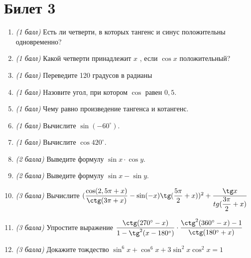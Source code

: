 \documentclass[12pt, a4paper]{article}
\begin{document}
\section*{Билет 3}
\begin{enumerate}
	\item \textit{(1 балл)}	Есть ли четверти, в которых тангенс и синус положительны одновременно? 
	\item \textit{(1 балл)}	Какой четверти принадлежит $x$ , если $\cos x$ положительный?
	\item \textit{(1 балл)}	Переведите 120 градусов в радианы
	\item \textit{(1 балл)}	Назовите угол, при котором $\cos$  равен $0,5$.
	\item \textit{(1 балл)} Чему равно произведение тангенса и котангенс.
	\item \textit{(1 балл)} Вычислите $\sin (-60^{\circ})$.
	\item \textit{(1 балл)}	Вычислите $\cos 420^{\circ}$.
	\item \textit{(2 балла)} Выведите формулу $\sin x \cdot \cos y$.
	\item \textit{(2 балла)} Выведите формулу $\sin x - \sin y$.
	\item \textit{(3 балла)} Вычислите $(\dfrac{\cos (2,5\pi + x)}{\ctg (3\pi + x)} - \sin (-x) \tg (\dfrac{5\pi}{2}+x))^2 + \dfrac{\tg x}{tg (\dfrac{3\pi}{2}+x)}$
	\item \textit{(3 балла)} Упростите выражение $\dfrac{\ctg(270^{\circ}-x)}{1-\tg^2(x-180^{\circ})} \cdot \dfrac{\ctg^2(360^{\circ}-x)-1}{\ctg(180^{\circ}+x)}$
	\item \textit{(3 балла)} Докажите тождество $\sin^6x + \cos^6x + 3\sin^2x\cos^2x = 1$
\end{enumerate}
\end{document}
